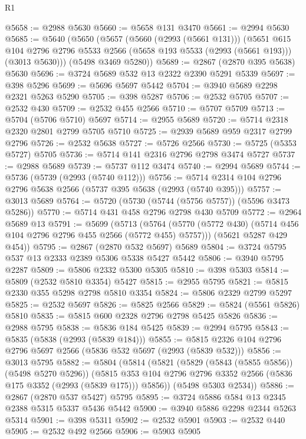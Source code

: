 \begin{lexlean}{R1}
\begin{coremodule}
@5658 := @2988 @5630
@5660 := @5658 @131 @3470
@5661 := @2994 @5630
@5685 := @5640
    (@5650
      (@5657
        (@5660 (@2993 (@5661 @131)))
        (@5651
          @615
          @104
          @2796
          @2796
          @5533
          @2566
          (@5658 @193 @5533 (@2993 (@5661 @193)))
          (@3013 @5630)))
      (@5498 @3469 @5280))
@5689 := @2867 (@2870 @395 @5638) @5630
@5696 := @3724 @5689 @532 @13 @2322 @2390 @5291 @5339
@5697 := @398 @5296
@5699 := @5696 @5697 @5442
@5704 := @3940 @5689 @2298 @2321 @5263 @5290
@5705 := @398 @5287
@5706 := @2532 @5705
@5707 := @2532 @430
@5709 := @2532 @455 @2566
@5710 := @5707 @5709
@5713 := @5704 (@5706 @5710) @5697
@5714 := @2955 @5689
@5720 := @5714 @2318 @2320 @2801 @2799 @5705 @5710
@5725 := @2939 @5689 @959 @2317 @2799 @2796
@5726 := @2532 @5638
@5727 := @5726 @2566
@5730 := @5725 (@5353 @5727) @5705
@5736 := @5714 @141 @2316 @2796 @2798 @3474 @5727
@5737 := @2988 @5689
@5739 := @5737 @112 @3474
@5740 := @2994 @5689
@5744 := @5736 (@5739 (@2993 (@5740 @112)))
@5756 := @5714 @2314 @104 @2796 @2796 @5638 @2566 (@5737 @395 @5638 (@2993 (@5740 @395)))
@5757 := @3013 @5689
@5764 := @5720 (@5730 (@5744 (@5756 @5757)) (@5596 @3473 @5286))
@5770 := @5714 @431 @458 @2796 @2798 @430 @5709
@5772 := @2964 @5689 @13
@5791 := @5699
    (@5713
      (@5764 (@5770 (@5772 @430) (@5714 @456 @104 @2796 @2796 @455 @2566 (@5772 @455) @5757)))
      (@5621 @5287 @429 @454))
@5795 := @2867 (@2870 @532 @5697) @5689
@5804 := @3724 @5795 @537 @13 @2333 @2389 @5306 @5338 @5427 @5442
@5806 := @3940 @5795 @2287
@5809 := @5806 @2332 @5300 @5305
@5810 := @398 @5303
@5814 := @5809 (@2532 @5810 @3354) @5427
@5815 := @2955 @5795
@5821 := @5815 @2330 @355 @5298 @2798 @5810 @3354
@5824 := @5806 @2329 @2799 @5297
@5825 := @2532 @5697
@5826 := @5825 @2566
@5829 := @5824 (@5561 @5826) @5810
@5835 := @5815 @600 @2328 @2796 @2798 @5425 @5826
@5836 := @2988 @5795
@5838 := @5836 @184 @5425
@5839 := @2994 @5795
@5843 := @5835 (@5838 (@2993 (@5839 @184)))
@5855 := @5815 @2326 @104 @2796 @2796 @5697 @2566 (@5836 @532 @5697 (@2993 (@5839 @532)))
@5856 := @3013 @5795
@5882 := @5804
    (@5814
      (@5821
        (@5829 (@5843 (@5855 @5856)) (@5498 @5270 @5296))
        (@5815 @353 @104 @2796 @2796 @3352 @2566 (@5836 @175 @3352 (@2993 (@5839 @175))) @5856))
      (@5498 @5303 @2534))
@5886 := @2867 (@2870 @537 @5427) @5795
@5895 := @3724 @5886 @584 @13 @2345 @2388 @5315 @5337 @5436 @5442
@5900 := @3940 @5886 @2298 @2344 @5263 @5314
@5901 := @398 @5311
@5902 := @2532 @5901
@5903 := @2532 @440
@5905 := @2532 @492 @2566
@5906 := @5903 @5905

\end{coremodule}
\end{lexlean}
